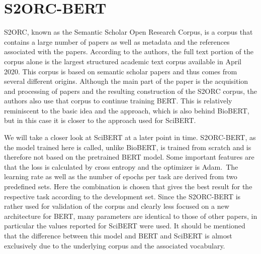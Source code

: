 \section{S2ORC-BERT}
S2ORC, known as the Semantic Scholar Open Research Corpus, is a corpus that contains a large number of papers as well as metadata and the references associated with the papers. According to the authors, the full text portion of the corpus alone is the largest structured academic text corpus available in April 2020. This corpus is based on semantic scholar papers and thus comes from several different origins. Although the main part of the paper is the acquisition and processing of papers and the resulting construction of the S2ORC corpus, the authors also use that corpus to continue training BERT. This is relatively reminiscent to the basic idea and the approach, which is also behind BioBERT, but in this case it is closer to the approach used for SciBERT. 

We will take a closer look at SciBERT at a later point in time. S2ORC-BERT, as the model trained here is called, unlike BioBERT, is trained from scratch and is therefore not based on the pretrained BERT model. Some important features are that the loss is calculated by cross entropy and the optimizer is Adam. The learning rate as well as the number of epochs per task are derived from two predefined sets. Here the combination is chosen that gives the best result for the respective task according to the development set. Since the S2ORC-BERT is rather used for validation of the corpus and clearly less focused on a new architecture for BERT, many parameters are identical to those of other papers, in particular the values reported for SciBERT were used. It should be mentioned that the difference between this model and BERT and SciBERT is almost exclusively due to the underlying corpus and the associated vocabulary.  




